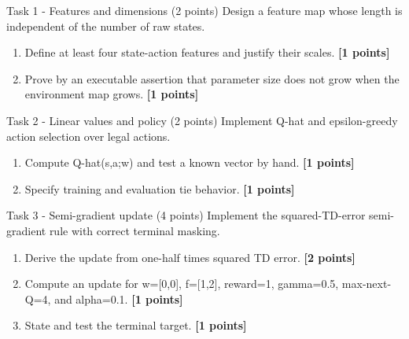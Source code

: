 \documentclass[aspectratio=169,11pt]{beamer}
\begin{document}
\begin{frame}{Task 1 - Features and dimensions (2 points)}
\small
Design a feature map whose length is independent of the number of raw states.

\vspace{0.2cm}
\begin{enumerate}
\item[\textbf{a.}] Define at least four state-action features and justify their scales. \hfill{\color{courseblue}\textbf{[1 points]}}
\item[\textbf{b.}] Prove by an executable assertion that parameter size does not grow when the environment map grows. \hfill{\color{courseblue}\textbf{[1 points]}}
\end{enumerate}
\end{frame}

\begin{frame}{Task 2 - Linear values and policy (2 points)}
\small
Implement Q-hat and epsilon-greedy action selection over legal actions.

\vspace{0.2cm}
\begin{enumerate}
\item[\textbf{a.}] Compute Q-hat(s,a;w) and test a known vector by hand. \hfill{\color{courseblue}\textbf{[1 points]}}
\item[\textbf{b.}] Specify training and evaluation tie behavior. \hfill{\color{courseblue}\textbf{[1 points]}}
\end{enumerate}
\end{frame}

\begin{frame}{Task 3 - Semi-gradient update (4 points)}
\small
Implement the squared-TD-error semi-gradient rule with correct terminal masking.

\vspace{0.2cm}
\begin{enumerate}
\item[\textbf{a.}] Derive the update from one-half times squared TD error. \hfill{\color{courseblue}\textbf{[2 points]}}
\item[\textbf{b.}] Compute an update for w=[0,0], f=[1,2], reward=1, gamma=0.5, max-next-Q=4, and alpha=0.1. \hfill{\color{courseblue}\textbf{[1 points]}}
\item[\textbf{c.}] State and test the terminal target. \hfill{\color{courseblue}\textbf{[1 points]}}
\end{enumerate}
\end{frame}
\end{document}
